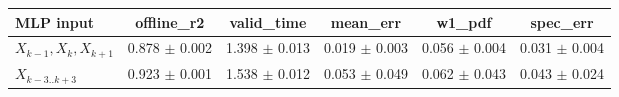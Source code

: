 \begin{tabular}{lccccc}
\toprule
MLP input & offline\_r2 & valid\_time & mean\_err & w1\_pdf & spec\_err \\
\midrule
$X_{k-1},X_k,X_{k+1}$ & 0.878 $\pm$ 0.002 & 1.398 $\pm$ 0.013 & 0.019 $\pm$ 0.003 & 0.056 $\pm$ 0.004 & 0.031 $\pm$ 0.004 \\
$X_{k-3..k+3}$ & 0.923 $\pm$ 0.001 & 1.538 $\pm$ 0.012 & 0.053 $\pm$ 0.049 & 0.062 $\pm$ 0.043 & 0.043 $\pm$ 0.024 \\
\bottomrule
\end{tabular}
